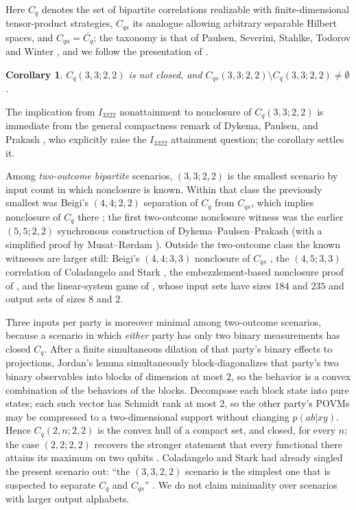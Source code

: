 \documentclass[11pt]{article}
\newtheorem{corollary}[theorem]{Corollary}
\theoremstyle{remark}
\newcommand{\Cq}{C_q}
\newcommand{\Cqs}{C_{qs}}
\begin{document}
Here $\Cq$ denotes the set of bipartite correlations realizable with
finite-dimensional tensor-product strategies, $\Cqs$ its analogue allowing
arbitrary separable Hilbert spaces, and $C_{qa}=\overline{\Cq}$; the
taxonomy is that of Paulsen, Severini, Stahlke, Todorov and Winter
\cite{PSSTW}, and we follow the presentation of
\cite{Lupini,ColadangeloStark}.

\begin{corollary}\label{cor:nonclosure}
$\Cq(3,3;2,2)$ is not closed, and
$\Cqs(3,3;2,2)\setminus \Cq(3,3;2,2)\neq\emptyset$.
\end{corollary}

The implication from $I_{3322}$ nonattainment to nonclosure of
$\Cq(3,3;2,2)$ is immediate from the general compactness remark of Dykema,
Paulsen, and Prakash \cite{DPPQIC}, who explicitly raise the $I_{3322}$
attainment question; the corollary settles it.

Among \emph{two-outcome bipartite} scenarios, $(3,3;2,2)$ is the smallest
scenario by input count in which nonclosure is known. Within that class the
previously smallest was Beigi's $(4,4;2,2)$ separation of $\Cq$ from $\Cqs$,
which implies nonclosure of $\Cq$ there \cite{Beigi}; the first two-outcome
nonclosure witness was the earlier $(5,5;2,2)$ synchronous construction of
Dykema--Paulsen--Prakash \cite{DPP} (with a simplified proof by
Musat--R{\o}rdam \cite{MusatRordam}). Outside the two-outcome class the known witnesses are larger
still: Beigi's $(4,4;3,3)$ nonclosure of $\Cqs$ \cite{Beigi}, the
$(4,5;3,3)$ correlation of Coladangelo and Stark \cite{ColadangeloStark},
the embezzlement-based nonclosure proof of \cite{Coladangelo}, and the
linear-system game of \cite{Slofstra2}, whose input sets have sizes $184$
and $235$ and output sets of sizes $8$ and $2$.

Three inputs per party is moreover minimal among
two-outcome scenarios, because a scenario in which \emph{either} party has
only two binary measurements has closed $\Cq$. After a finite simultaneous
dilation of that party's binary effects to projections, Jordan's lemma
simultaneously block-diagonalizes that party's two binary observables into
blocks of dimension at most $2$, so the behavior is a convex combination of
the behaviors of the blocks. Decompose each block state into pure states;
each such vector has Schmidt rank at most $2$, so the other party's POVMs
may be compressed to a two-dimensional
support without changing $p(ab|xy)$. Hence $\Cq(2,n;2,2)$ is the convex hull
of a compact set, and closed, for every $n$; the case $(2,2;2,2)$ recovers
the stronger statement that every functional there attains its maximum on
two qubits \cite{Masanes}. Coladangelo and Stark had already singled the
present scenario out: ``the $(3,3,2,2)$ scenario is the simplest one that is
suspected to separate $C_q$ and $C_{qs}$'' \cite{ColadangeloStark}. We do
not claim minimality over scenarios with larger output alphabets.
\end{document}
